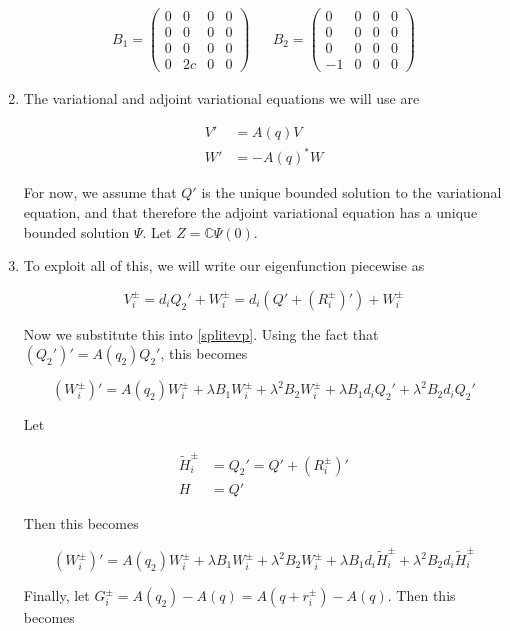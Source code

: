 \documentclass[12pt]{article}
\def\C{{\mathbb C}}
\begin{document}
\begin{enumerate}
\begin{align*}
B_1 = \begin{pmatrix}
0 & 0 & 0 & 0 \\
0 & 0 & 0 & 0 \\
0 & 0 & 0 & 0 \\
0 & 2 c & 0 & 0 
\end{pmatrix} &&
B_2 = \begin{pmatrix}
0 & 0 & 0 & 0 \\
0 & 0 & 0 & 0 \\
0 & 0 & 0 & 0 \\
-1 & 0 & 0 & 0 
\end{pmatrix}
\end{align*}

\item The variational and adjoint variational equations we will use are

\begin{align}
V' &= A(q)V \\
W' &= -A(q)^* W
\end{align}

For now, we assume that $Q'$ is the unique bounded solution to the variational equation, and that therefore the adjoint variational equation has a unique bounded solution $\Psi$. Let $Z = \C \Psi(0)$.

\item To exploit all of this, we will write our eigenfunction piecewise as

\[
V_i^\pm = d_i Q_2' + W_i^\pm = d_i(Q' + (R_i^\pm)') + W_i^\pm
\]


Now we substitute this into \eqref{splitevp}. Using the fact that $(Q_2')' = A(q_2)Q_2'$, this becomes

\[
(W_i^\pm)' =A(q_2)W_i^\pm + \lambda B_1 W_i^\pm + \lambda^2 B_2 W_i^\pm 
+ \lambda B_1 d_i Q_2' + \lambda^2 B_2 d_i Q_2' 
\]

Let 

\begin{align*}
\tilde{H}_i^\pm &= Q_2' = Q' + (R_i^\pm)' \\
H &= Q'
\end{align*}

Then this becomes

\[
(W_i^\pm)' =A(q_2)W_i^\pm + \lambda B_1 W_i^\pm + \lambda^2 B_2 W_i^\pm 
+ \lambda B_1 d_i \tilde{H}_i^\pm + \lambda^2 B_2 d_i \tilde{H}_i^\pm 
\]

Finally, let $G_i^\pm = A(q_2) - A(q) = A(q + r_i^\pm) - A(q)$. Then this becomes


\end{enumerate}
\end{document}
